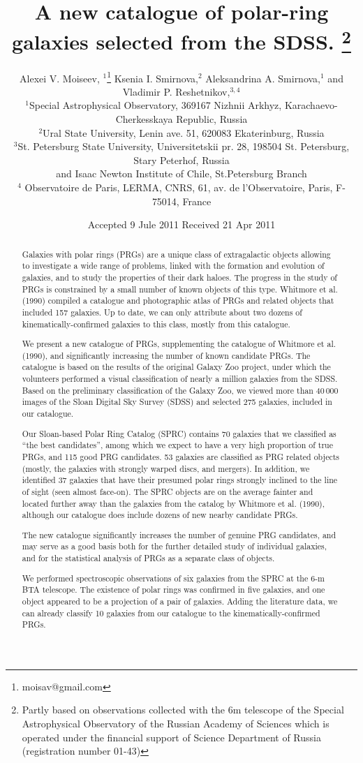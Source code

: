 \documentclass[useAMS,usenatbib]{mn2e}
\title[A new catalogue of polar-ring galaxies]{A new catalogue of polar-ring galaxies selected from the SDSS.
\thanks{Partly based on observations collected with the 6m  telescope of the Special Astrophysical Observatory of the  Russian Academy of Sciences which is operated under the financial support of Science Department of Russia (registration number 01-43)}}
\author[Moiseev et al.]
{Alexei V. Moiseev, $^1$\thanks{moisav@gmail.com} Ksenia I.
Smirnova,$^2$
 Aleksandrina A. Smirnova,$^{1}$
 \newauthor and Vladimir P.  Reshetnikov,$^{3,4}$  \\
$^1$Special Astrophysical Observatory,  369167 Nizhnii Arkhyz,  Karachaevo-Cherkesskaya Republic,  Russia\\
$^2$Ural State University, Lenin ave. 51, 620083 Ekaterinburg, Russia\\
$^3$St. Petersburg State University, Universitetskii pr. 28,  198504 St. Petersburg, Stary Peterhof,  Russia\\
and Isaac Newton Institute of Chile, St.Petersburg Branch\\
$^4$ Observatoire de Paris, LERMA, CNRS, 61, av. de l'Observatoire, Paris, F-75014, France
}
\begin{document}
\date{Accepted 9 Jule 2011  Received 21 Apr 2011}

\pagerange{\pageref{firstpage}--\pageref{lastpage}} 


\maketitle

\label{firstpage}

\begin{abstract}
Galaxies with polar rings (PRGs) are a unique class of extragalactic
objects allowing to investigate a wide range of problems, linked
with the formation and evolution of galaxies, and to study the
properties of their dark haloes. The progress in the study of PRGs
is constrained by a small number of known objects of this type.
Whitmore et al. (1990) compiled a catalogue and photographic
atlas of PRGs and related objects that included 157 galaxies.
Up to date, we can only attribute about two dozens of
kinematically-confirmed galaxies to this class, mostly from this catalogue.

We present a new catalogue of PRGs, supplementing the catalogue of
Whitmore et al. (1990), and significantly increasing the number of
known candidate PRGs. The catalogue is based on the results of the
 original Galaxy Zoo project, under which the volunteers performed a visual
classification of nearly a million galaxies from the SDSS. Based
on the preliminary classification of the Galaxy Zoo, we viewed
more than 40\,000 images of the Sloan Digital Sky Survey (SDSS)
and selected  275 galaxies, included in our catalogue.

Our Sloan-based Polar Ring Catalog (SPRC) contains  70 galaxies that we classified as
``the best candidates'', among which we expect to have a very high
proportion of true PRGs, and  115 good  PRG candidates.   53
galaxies are classified as PRG related  objects
(mostly, the galaxies with strongly warped discs, and mergers). In
addition, we identified  37 galaxies that have their presumed polar
rings strongly inclined to the line of sight (seen
almost face-on).  The SPRC objects are on the average fainter and
located further away than the galaxies from the catalog by
Whitmore et al. (1990), although our catalogue does include
dozens of new nearby candidate PRGs.

The new catalogue significantly  increases the number of genuine
PRG candidates, and may serve as a good basis both for the further
detailed study of individual galaxies, and for the statistical
analysis of PRGs as a separate class of objects.

We performed spectroscopic observations of six galaxies from the
SPRC at the 6-m BTA telescope. The existence of polar rings was
confirmed in five galaxies, and one object appeared to be a
projection of a pair of galaxies. Adding the literature data, we
can already classify 10 galaxies from our catalogue to the
kinematically-confirmed PRGs.

\end{abstract}
\end{document}
